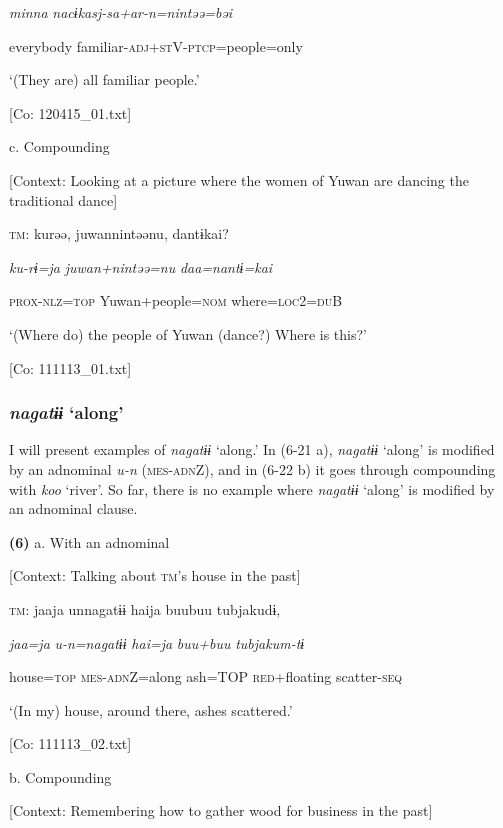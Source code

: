       \textit{minna}  \textit{nacɨkasj-sa+ar-n=nintəə=bəi}

      everybody  familiar-\textsc{adj}+\textsc{st}V-\textsc{ptcp}=people=only

      ‘(They are) all familiar people.’

      [Co: 120415\_01.txt]

  c.  Compounding

    [Context: Looking at a picture where the women of Yuwan are dancing the traditional dance]

    \textsc{tm}:  kurəə,  juwannintəənu,  dantɨkai?

      \textit{ku-rɨ=ja}  \textit{juwan+nintəə=nu}  \textit{daa=nantɨ=kai}

      \textsc{prox}-\textsc{nlz}=\textsc{top}  Yuwan+people=\textsc{nom}  where=\textsc{loc}2=\textsc{du}B

      ‘(Where do) the people of Yuwan (dance?) Where is this?’

      [Co: 111113\_01.txt]

\subsubsection{\textit{nagatɨɨ} ‘along’}

I will present examples of \textit{nagatɨɨ} ‘along.’ In (6-21 a), \textit{nagatɨɨ} ‘along’ is modified by an adnominal \textit{u-n} (\textsc{mes}-\textsc{adn}Z), and in (6-22 b) it goes through compounding with \textit{koo} ‘river’. So far, there is no example where \textit{nagatɨɨ} ‘along’ is modified by an adnominal clause.

\textbf{(6)}  a.  With an adnominal

    [Context: Talking about \textsc{tm}’s house in the past]

    \textsc{tm}:  jaaja  unnagatɨɨ  haija  buubuu  tubjakudɨ,

      \textit{jaa=ja}  \textit{u-n=nagatɨɨ}  \textit{hai=ja}  \textit{buu+buu}  \textit{tubjakum-tɨ}

      house=\textsc{top}  \textsc{mes}-\textsc{adn}Z=along  ash=TOP  \textsc{red}+floating  scatter-\textsc{seq}

      ‘(In my) house, around there, ashes scattered.’

      [Co: 111113\_02.txt]

  b.  Compounding

    [Context: Remembering how to gather wood for business in the past]

